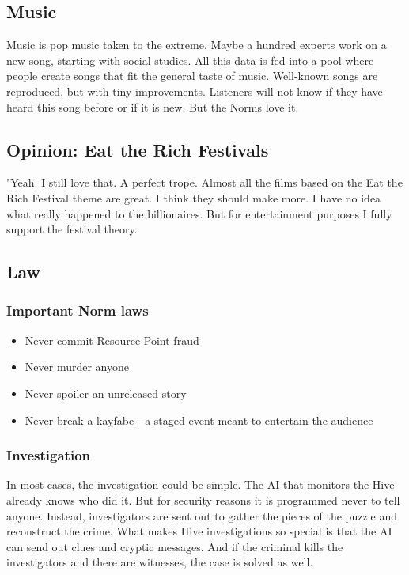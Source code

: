 \subsection{Music}

Music is pop music taken to the extreme. Maybe a hundred experts work on a new song, starting with social studies. All this data is fed into a pool where people create songs that fit the general taste of music. Well-known songs are reproduced, but with tiny improvements. Listeners will not know if they have heard this song before or if it is new. But the Norms love it.

\subsection{Opinion: Eat the Rich Festivals}

"Yeah. I still love that. A perfect trope. Almost all the films based on the Eat the Rich Festival theme are great. I think they should make more. I have no idea what really happened to the billionaires. But for entertainment purposes I fully support the festival theory.

\subsection{Law}
\label{sec: norm law}

\subsubsection{Important Norm laws}

\begin{itemize}
\item{Never commit Resource Point fraud}
\item{Never murder anyone}
\item{Never spoiler an unreleased story}
\item{Never break a \href{https://en.wikipedia.org/wiki/Kayfabe}{kayfabe} - a staged event meant to entertain the audience}
\end{itemize}

\subsubsection{Investigation}

In most cases, the investigation could be simple. The AI that monitors the Hive already knows who did it. But for security reasons it is programmed never to tell anyone. Instead, investigators are sent out to gather the pieces of the puzzle and reconstruct the crime.
What makes Hive investigations so special is that the AI can send out clues and cryptic messages. And if the criminal kills the investigators and there are witnesses, the case is solved as well.

